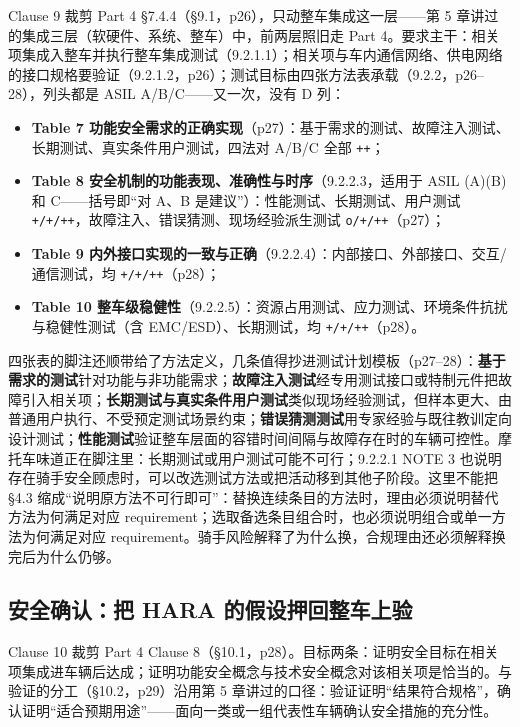 Clause 9 裁剪 Part 4 §7.4.4（§9.1，p26），只动整车集成这一层——第 5 章讲过的集成三层（软硬件、系统、整车）中，前两层照旧走 Part 4。要求主干：相关项集成入整车并执行整车集成测试（9.2.1.1）；相关项与车内通信网络、供电网络的接口规格要验证（9.2.1.2，p26）；测试目标由四张方法表承载（9.2.2，p26–28），列头都是 ASIL A/B/C——又一次，没有 D 列：

\begin{itemize}
\item \textbf{Table 7 功能安全需求的正确实现}（p27）：基于需求的测试、故障注入测试、长期测试、真实条件用户测试，四法对 A/B/C 全部 \nolinkurl{++}；
\item \textbf{Table 8 安全机制的功能表现、准确性与时序}（9.2.2.3，适用于 ASIL (A)(B) 和 C——括号即“对 A、B 是建议”）：性能测试、长期测试、用户测试 \nolinkurl{+/+/++}，故障注入、错误猜测、现场经验派生测试 \nolinkurl{o/+/++}（p27）；
\item \textbf{Table 9 内外接口实现的一致与正确}（9.2.2.4）：内部接口、外部接口、交互/通信测试，均 \nolinkurl{+/+/++}（p28）；
\item \textbf{Table 10 整车级稳健性}（9.2.2.5）：资源占用测试、应力测试、环境条件抗扰与稳健性测试（含 EMC/ESD）、长期测试，均 \nolinkurl{+/+/++}（p28）。
\end{itemize}

四张表的脚注还顺带给了方法定义，几条值得抄进测试计划模板（p27–28）：\textbf{基于需求的测试}针对功能与非功能需求；\textbf{故障注入测试}经专用测试接口或特制元件把故障引入相关项；\textbf{长期测试与真实条件用户测试}类似现场经验测试，但样本更大、由普通用户执行、不受预定测试场景约束；\textbf{错误猜测测试}用专家经验与既往教训定向设计测试；\textbf{性能测试}验证整车层面的容错时间间隔与故障存在时的车辆可控性。摩托车味道正在脚注里：长期测试或用户测试可能不可行；9.2.2.1 NOTE 3 也说明存在骑手安全顾虑时，可以改选测试方法或把活动移到其他子阶段。这里不能把 §4.3 缩成“说明原方法不可行即可”：替换连续条目的方法时，理由必须说明替代方法为何满足对应 requirement；选取备选条目组合时，也必须说明组合或单一方法为何满足对应 requirement。骑手风险解释了为什么换，合规理由还必须解释换完后为什么仍够。

\subsection{安全确认：把 HARA 的假设押回整车上验}

Clause 10 裁剪 Part 4 Clause 8（§10.1，p28）。目标两条：证明安全目标在相关项集成进车辆后达成；证明功能安全概念与技术安全概念对该相关项是恰当的。与验证的分工（§10.2，p29）沿用第 5 章讲过的口径：验证证明“结果符合规格”，确认证明“适合预期用途”——面向一类或一组代表性车辆确认安全措施的充分性。


